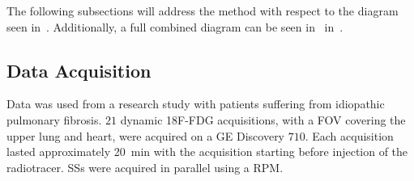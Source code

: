             The following subsections will address the method with respect to the diagram seen in~. Additionally, a full combined diagram can be seen in~ in~.
            
            \subsection{Data Acquisition} \label{sec:pca_data_driven_surrogate_signal_extraction_methods_for_dynamic_pet_methods_data_acquisition}
                Data was used from a research study with patients suffering from idiopathic pulmonary fibrosis. $21$ dynamic \gls{18F-FDG} acquisitions, with a \gls{FOV} covering the upper lung and heart, were acquired on a \gls{GE} Discovery $710$. Each acquisition lasted approximately \SI{20}{\minute} with the acquisition starting before injection of the radiotracer. \glspl{SS} were acquired in parallel using a \gls{RPM}.
                
